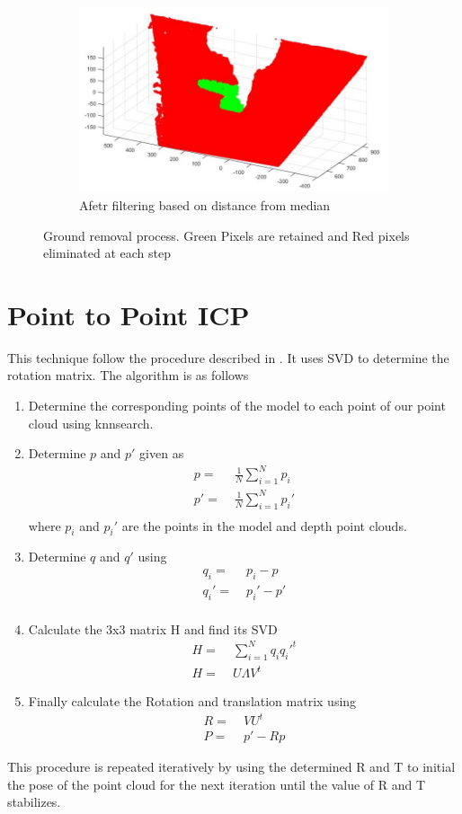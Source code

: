 \documentclass[letterpaper, 10 pt, conference]{ieeeconf}  %
\begin{document}
\begin{figure}
\begin{subfigure}{.3\textwidth}
  \centering
  \includegraphics[scale=0.3]{clean.jpg}
  \caption{Afetr filtering based on distance from median}
  \label{fig:clean}
\end{subfigure}%
\caption{Ground removal process. Green Pixels are retained and Red pixels eliminated at each step}
\label{fig:gr}
\end{figure}


\section{Point to Point ICP}
\label{sec:p2p}
This technique follow the procedure described in \cite{c1}. It uses SVD to determine the rotation matrix. The algorithm is as follows
\begin{enumerate}
\item Determine the corresponding points of the model to each point of our point cloud using knnsearch.
\item Determine $p$ and $p'$ given as
\begin{align*}
p =&\; \frac{1}{N}\sum_{i=1}^N p_i \\
p' =&\; \frac{1}{N}\sum_{i=1}^N p_i' \\
\end{align*}
where $p_i$ and $p_i'$ are the points in the model and depth point clouds.
\item Determine $q$ and $q'$ using
\begin{align*}
q_i =&\; p_i - p \\
q_i' =&\; p_i' - p' \\
\end{align*}
\item Calculate the 3x3 matrix H and find its SVD
\begin{align*}
H =&\; \sum_{i=1}^N q_iq_i'^{t} \\
H =&\; U \Lambda V^t
\end{align*}
\item Finally calculate the Rotation and translation matrix using
\begin{align*}
R =&\; VU^t \\
P =&\; p' - Rp
\end{align*}
\end{enumerate}
This procedure is repeated iteratively by using the determined R and T to initial the pose of the point cloud for the next iteration until the value of R and T stabilizes.
\end{document}
